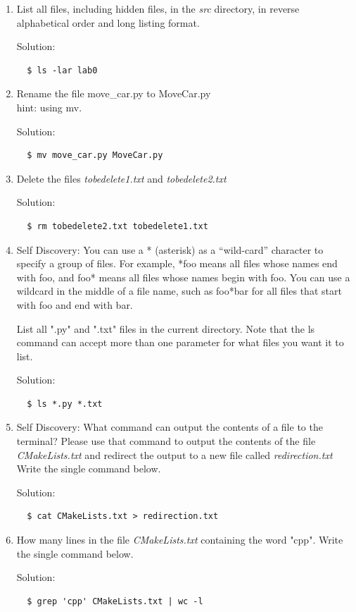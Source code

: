 \documentclass[12pt]{article}
\begin{document}
\begin{enumerate}
\item List all files, including hidden files, in the \textit{src} directory, in reverse alphabetical order and long listing format.

Solution:

\begin{verbatim}
  $ ls -lar lab0
\end{verbatim}

\item Rename the file move\_car.py to MoveCar.py\\
hint: using mv.

Solution:

\begin{verbatim}
  $ mv move_car.py MoveCar.py
\end{verbatim}

\item Delete the files \textit{tobedelete1.txt} and \textit{tobedelete2.txt}

Solution: 

\begin{verbatim}
  $ rm tobedelete2.txt tobedelete1.txt
\end{verbatim}

\item Self Discovery: You can use a * (asterisk) as a “wild-card” character to specify a group of files. For example, *foo means all files whose names end with foo, and foo* means all files whose names begin with foo. You can use a wildcard in the middle of a file name, such as foo*bar for all files that start with foo and end with bar.

List all ".py" and ".txt" files in the current directory. Note that the ls command can accept more than one parameter for what files you want it to list.  

Solution:

\begin{verbatim}
  $ ls *.py *.txt
\end{verbatim}

\item Self Discovery: What command can output the contents of a file to the terminal? Please use that command to  output the contents of the file \textit{CMakeLists.txt} and redirect the output to a new file called \textit{redirection.txt} Write the single command below.

Solution:

\begin{verbatim}
  $ cat CMakeLists.txt > redirection.txt
\end{verbatim}

\item How many lines in the file \textit{CMakeLists.txt} containing the word "cpp". Write the single command below.

Solution: 

\begin{verbatim}
  $ grep 'cpp' CMakeLists.txt | wc -l
\end{verbatim}

\end{enumerate}
\end{document}
